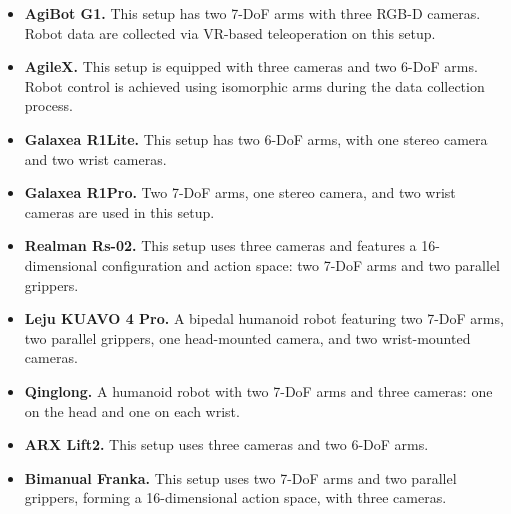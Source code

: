 \begin{itemize}

    \item\textbf{AgiBot G1.}
    This setup has two 7-DoF arms with three RGB-D cameras. Robot data are collected via VR-based teleoperation on this setup.
    
    \item\textbf{AgileX.}
    This setup is equipped with three cameras and two 6-DoF arms. Robot control is achieved using isomorphic arms during the data collection process.

    \item\textbf{Galaxea R1Lite.}
    This setup has two 6-DoF arms, with one stereo camera and two wrist cameras.
    
    \item\textbf{Galaxea R1Pro.}
    Two 7-DoF arms, one stereo camera, and two wrist cameras are used in this setup. 
    
    \item\textbf{Realman Rs-02.}
    This setup uses three cameras and features a 16-dimensional configuration and action space: two 7-DoF arms and two parallel grippers.
    
    \item\textbf{Leju KUAVO 4 Pro.}
    A bipedal humanoid robot featuring two 7-DoF arms, two parallel grippers, one head-mounted camera, and two wrist-mounted cameras.
    
    \item\textbf{Qinglong.}
    A humanoid robot with two 7-DoF arms and three cameras: one on the head and one on each wrist.
    
    \item\textbf{ARX Lift2.}
    This setup uses three cameras and two 6-DoF arms.
    
    \item\textbf{Bimanual Franka.}
    This setup uses two 7-DoF arms and two parallel grippers, forming a 16-dimensional action space, with three cameras.
     
\end{itemize}


